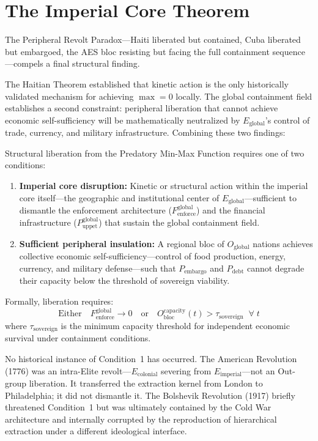 \documentclass[12pt,openany]{book}
\begin{document}
\section{The Imperial Core Theorem}

The Peripheral Revolt Paradox---Haiti liberated but contained, Cuba liberated but embargoed, the AES bloc resisting but facing the full containment sequence---compels a final structural finding.

The Haitian Theorem established that kinetic action is the only historically validated mechanism for achieving $\max = 0$ locally. The global containment field establishes a second constraint: peripheral liberation that cannot achieve economic self-sufficiency will be mathematically neutralized by $E_{\text{global}}$'s control of trade, currency, and military infrastructure. Combining these two findings:

\begin{definition}
Structural liberation from the Predatory Min-Max Function requires one of two conditions:
\begin{enumerate}
    \item \textbf{Imperial core disruption:} Kinetic or structural action within the imperial core itself---the geographic and institutional center of $E_{\text{global}}$---sufficient to dismantle the enforcement architecture ($F_{\text{enforce}}^{\text{global}}$) and the financial infrastructure ($P_{\text{uppet}}^{\text{global}}$) that sustain the global containment field.
    \item \textbf{Sufficient peripheral insulation:} A regional bloc of $O_{\text{global}}$ nations achieves collective economic self-sufficiency---control of food production, energy, currency, and military defense---such that $P_{\text{embargo}}$ and $P_{\text{debt}}$ cannot degrade their capacity below the threshold of sovereign viability.
\end{enumerate}
Formally, liberation requires:
\[
\text{Either} \quad F_{\text{enforce}}^{\text{global}} \rightarrow 0 \quad \text{or} \quad O_{\text{bloc}}^{\text{capacity}}(t) > \tau_{\text{sovereign}} \;\;\forall\; t
\]
where $\tau_{\text{sovereign}}$ is the minimum capacity threshold for independent economic survival under containment conditions.
\end{definition}

No historical instance of Condition~1 has occurred. The American Revolution (1776) was an intra-Elite revolt---$E_{\text{colonial}}$ severing from $E_{\text{imperial}}$---not an Out-group liberation. It transferred the extraction kernel from London to Philadelphia; it did not dismantle it. The Bolshevik Revolution (1917) briefly threatened Condition~1 but was ultimately contained by the Cold War architecture and internally corrupted by the reproduction of hierarchical extraction under a different ideological interface.
\end{document}

